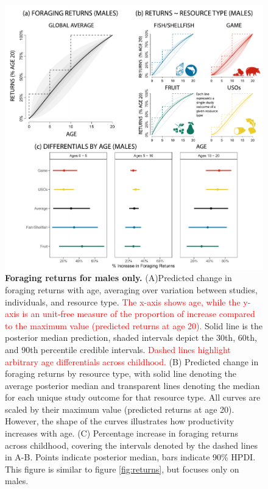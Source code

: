 \begin{figure}[h]
\centering
\includegraphics[width=12cm] {text/images/Figure_S4.pdf}
\renewcommand{\thefigure}{S\arabic{figure}}
\caption{\textbf{Foraging returns for males only.} (A)Predicted change in foraging returns with age, averaging over variation between studies, individuals, and resource type. \textcolor{red}{The x-axis shows age, while the y-axis is an unit-free measure of the proportion of increase compared to the maximum value (predicted returns at age 20).} Solid line is the posterior median prediction, shaded intervals depict the 30th, 60th, and 90th percentile credible intervals. \textcolor{red}{Dashed lines highlight arbitrary age differentials across childhood.} (B) Predicted change in foraging returns by resource type, with solid line denoting the average posterior median and transparent lines denoting the median for each unique study outcome for that resource type. All curves are scaled by their maximum value (predicted returns at age 20). However, the shape of the curves illustrates how productivity increases with age. (C) Percentage increase in foraging returns across childhood, covering the intervals denoted by the dashed lines in A-B. Points indicate posterior median, bars indicate 90\% HPDI. This figure is similar to figure \ref{fig:returns}, but focuses only on males.}
\label{fig:males_only}
\end{figure}


